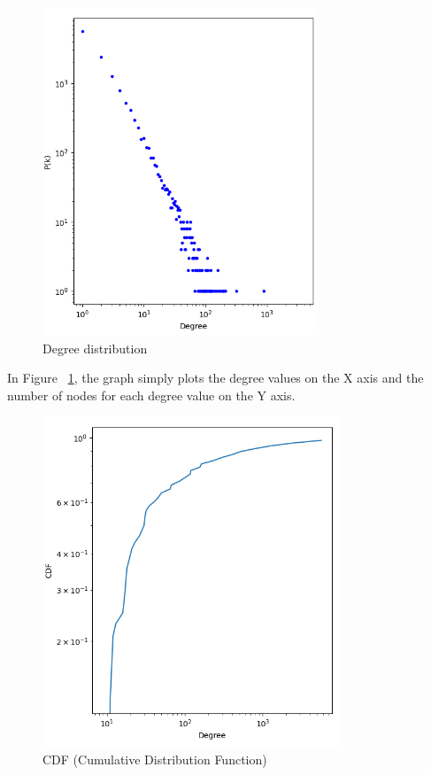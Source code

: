\documentclass[sigchi]{acmart}
\begin{document}
\begin{figure}[hbpt]
  \centering
  \includegraphics[width=0.8\linewidth]{img/degree_distribution.png}
  \caption{Degree distribution}
  \label{fig:Degree distribution}
\end{figure}

\noindent In Figure ~\ref{fig:Degree distribution}, the graph simply plots the degree values on the X axis and the number of nodes for each degree value on the Y axis.

\begin{figure}[hbpt]
  \centering
  \includegraphics[width=0.8\linewidth]{img/degree_CDF.png}
  \caption{CDF (Cumulative Distribution Function)}
  \label{fig:CDF}
\end{figure}
\end{document}
